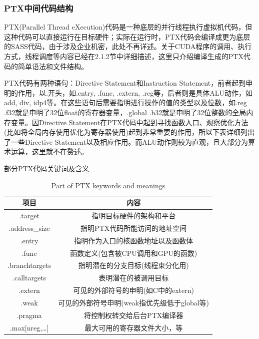 \subsubsection{PTX中间代码结构}
\par PTX(Parallel Thread eXecution)代码是一种底层的并行线程执行虚拟机代码，但这种代码可以直接运行在目标硬件；实际在运行时，PTX代码会编译成更为底层的SASS代码，由于涉及企业机密，此处不再详述。关于CUDA程序的调用、执行方式，线程调度等内容已经在2.1.2节中详细描述，这里只介绍编译生成的PTX代码的简单语法和文件结构。
\par PTX代码有两种语句：Directive Statement和Instruction Statement，前者起到申明的作用，以.开头，如.entry, .func, .extern, .reg等，后者则是具体ALU动作，如add, div, idp4等。在这些语句后需要指明进行操作的值的类型以及位数，如.reg	.f32就是申明了32位float的寄存器变量，.global	.b32就是申明了32位整数的全局内存变量。因Directive Statement在PTX代码中起到寻找函数入口、观察优化方法(比如将全局内存使用优化为寄存器使用)起到非常重要的作用，所以下表详细列出了一些Directive Statement以及相应作用。而ALU动作则较为直观，且大部分为算术运算，这里就不在赘述\parencite{PTX}。
\begin{table}
	\centering
	\renewcommand{\thetable}{\arabic{section}-\arabic{table} }
	\renewcommand{\tablename}{表}
	\caption{部分PTX代码关键词及含义}
	\addtocounter{table}{-1}
	\renewcommand{\thetable}{\arabic{section}-\arabic{table} }
	\renewcommand{\tablename}{Table}
	\caption{Part of PTX keywords and meanings}
	\begin{tabular}{cc}
		\toprule
		项目	&	内容	 \\
		\midrule
		.target & 指明目标硬件的架构和平台 \\
		.address\_size & 指明PTX代码所能访问的地址空间 \\
		.entry & 指明作为入口的核函数地址以及函数体 \\
		.func & 函数定义(包含被CPU调用和GPU的函数) \\
		.branchtargets & 指明潜在的分支目标(线程束分化用) \\
		.calltargets & 表明潜在的被调用目标 \\
		.extern & 可见的外部符号的申明(如C中的extern) \\
		.weak & 可见的外部符号申明(weak指优先级低于global等) \\
		.pragma & 将控制权转交给后台PTX编译器 \\
		.max[nreg,…] & 最大可用的寄存器文件大小，等 \\
		
		\bottomrule
	\end{tabular} \label{table-PTX关键词}\\
	
\end{table}
